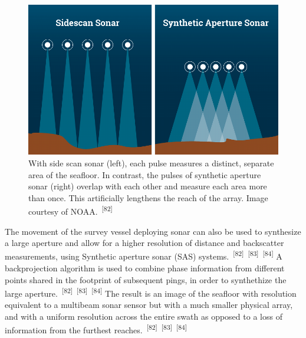 \documentclass{article}
\begin{document}

\begin{figure}
    \centering
    \includegraphics[width=1.0\linewidth]{images/sidescan-vs-sas.png}
    \caption{With side scan sonar (left), each pulse measures a distinct, separate area of the seafloor. In contrast, the pulses of synthetic aperture sonar (right) overlap with each other and measure each area more than once. This artificially lengthens the reach of the array. Image courtesy of NOAA.~\textsuperscript{[82]}}
    \label{figure23}
\end{figure}

\par{The movement of the survey vessel deploying sonar can also be used to synthesize a large aperture and allow for a higher resolution of distance and backscatter measurements, using Synthetic aperture sonar (SAS) systems.~\textsuperscript{[82]}~\textsuperscript{[83]}~\textsuperscript{[84]}  A backprojection algorithm is used to combine phase information from different points shared in the footprint of subsequent pings, in order to synthethize the large aperture.~\textsuperscript{[82]}~\textsuperscript{[83]}~\textsuperscript{[84]}  The result is an image of the seafloor with resolution equivalent to a multibeam sonar sensor but with a much smaller physical array, and with a uniform resolution across the entire swath as opposed to a loss of information from the furthest reaches.~\textsuperscript{[82]}~\textsuperscript{[83]}~\textsuperscript{[84]}}

\end{document}

